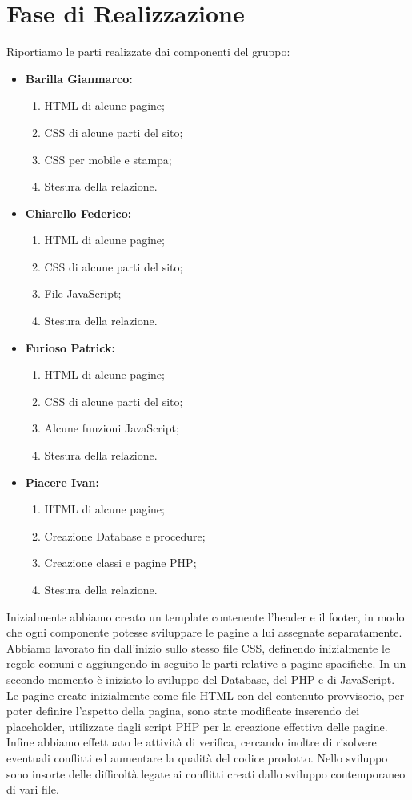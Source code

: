 \section{Fase di Realizzazione}
Riportiamo le parti realizzate dai componenti del gruppo:
\begin{itemize}
	\item \textbf{Barilla Gianmarco:}
	\begin{enumerate}
		\item HTML di alcune pagine;
		\item CSS di alcune parti del sito;
		\item CSS per mobile e stampa;
		\item Stesura della relazione.
	\end{enumerate}
	\item \textbf{Chiarello Federico:}
	\begin{enumerate}
		\item HTML di alcune pagine;
		\item CSS di alcune parti del sito;
		\item File JavaScript;
		\item Stesura della relazione.
	\end{enumerate}
	\item \textbf{Furioso Patrick:}
	\begin{enumerate}
		\item HTML di alcune pagine;
		\item CSS di alcune parti del sito;
		\item Alcune funzioni JavaScript;
		\item Stesura della relazione.
	\end{enumerate}
	\item \textbf{Piacere Ivan:}
	\begin{enumerate}
		\item HTML di alcune pagine;
		\item Creazione Database e procedure;
		\item Creazione classi e pagine PHP;
		\item Stesura della relazione.
	\end{enumerate}
\end{itemize}


Inizialmente abbiamo creato un template contenente l'header e il footer, in modo che ogni componente potesse sviluppare le pagine a lui assegnate separatamente.
Abbiamo lavorato fin dall'inizio sullo stesso file CSS, definendo inizialmente le regole comuni e aggiungendo in seguito le parti relative a pagine spacifiche.
In un secondo momento è iniziato lo sviluppo del Database, del PHP e di JavaScript.
Le pagine create inizialmente come file HTML con del contenuto provvisorio, per poter definire l'aspetto della pagina, sono state modificate inserendo dei placeholder,
utilizzate dagli script PHP per la creazione effettiva delle pagine.
Infine abbiamo effettuato le attività di verifica, cercando inoltre di risolvere eventuali conflitti ed aumentare la qualità del codice prodotto.
Nello sviluppo sono insorte delle difficoltà legate ai conflitti creati dallo sviluppo contemporaneo di vari file.
